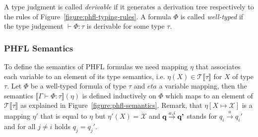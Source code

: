 A type judgment is called \textit{derivable} if it generates a derivation tree respectively to the rules of
Figure~\ref{figure:phfl-typing-rules}. A formula $\Phi$ is called \textit{well-typed} if the type
judgement $\vdash \Phi:\tau$ is derivable for some type $\tau$.



\subsubsection{PHFL Semantics}

To define the semantics of PHFL formulas we need mapping $\eta$ that associates each variable to an element of its
type semantics, i.e. $\eta(X) \in \mathcal{T}\llbracket\tau\rrbracket$ for $X$ of type $\tau$. Let $\Phi$ be a
well-typed formula of type $\tau$ and $eta$ a variable mapping, then the semantics $\llbracket\Gamma \vdash \Phi
\colon \tau \rrbracket(\eta)$ is defined inductively on $\Phi$ which maps to an element of
$\mathcal{T}\llbracket\tau\rrbracket$ as explained in Figure~\ref{figure:phfl-semantics}.
Remark, that $\eta[X \mapsto \mathcal{X}]$ is a mapping $\eta'$ that is equal to $\eta$ but $\eta'(X) = \mathcal{X}$ and
$\emph{q} \overset{a, i}{\rightarrow} \emph{q'}$ stands for $q_i \overset{a}{\rightarrow} {q_i}'$ and for all $j \neq i$
holds
$q_j = {q_j}'$.

